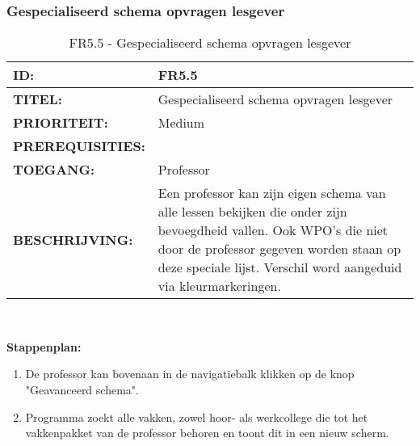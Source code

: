  
\subsubsection{Gespecialiseerd schema opvragen lesgever}       
\noindent\begin{table}[H]
            \begin{tabular}{l | p{10cm}}
                \textbf{ID:} & FR5.5 \\ \hline
                \textbf{TITEL:} & Gespecialiseerd schema opvragen lesgever\\ \hline
                \textbf{PRIORITEIT:} &  Medium \\ \hline
                \textbf{PREREQUISITIES:} & \\ \hline
                \textbf{TOEGANG:} & Professor \\ \hline
                \textbf{BESCHRIJVING:} & Een professor kan zijn eigen schema van alle lessen bekijken die onder zijn bevoegdheid vallen. Ook WPO's die niet door de professor gegeven worden staan op deze speciale lijst. Verschil word aangeduid via kleurmarkeringen. \\ 
            \end{tabular}\\
            \caption{FR5.5 - Gespecialiseerd schema opvragen lesgever}
            \label{tab:FR5.5 - Gespecializeerd schema opvragen lesgever}
        \end{table}
        
\textbf{Stappenplan:}
\begin{enumerate}
\item De professor kan bovenaan in de navigatiebalk klikken op de knop "Geavanceerd schema".
\item Programma zoekt alle vakken, zowel hoor- als werkcollege die tot het vakkenpakket van de professor behoren en toont dit in een nieuw scherm.
\end{enumerate}